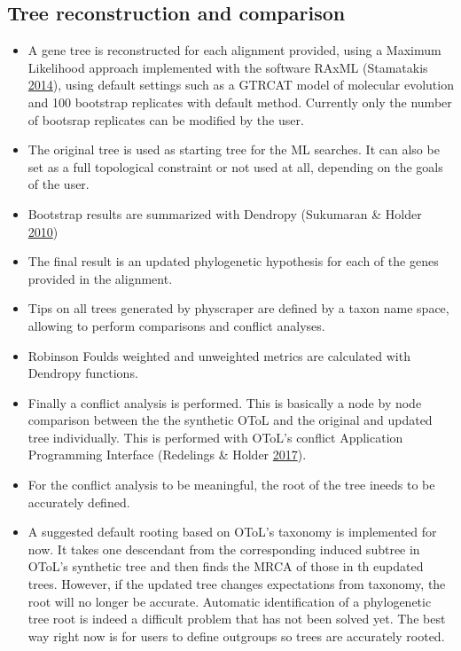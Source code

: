 \documentclass[]{article}
\providecommand{\tightlist}{%
  \setlength{\itemsep}{0pt}\setlength{\parskip}{0pt}}
\begin{document}
\hypertarget{tree-reconstruction-and-comparison}{%
\subsection{Tree reconstruction and comparison}\label{tree-reconstruction-and-comparison}}

\begin{itemize}
\tightlist
\item
  A gene tree is reconstructed for each alignment provided, using a Maximum Likelihood approach implemented with the software RAxML (Stamatakis \protect\hyperlink{ref-stamatakis2014raxml}{2014}), using default settings such as a GTRCAT model of molecular evolution and 100 bootstrap replicates with default method. Currently only the number of bootsrap replicates can be modified by the user.
\item
  The original tree is used as starting tree for the ML searches. It can also be set as a full topological constraint or not used at all, depending on the goals of the user.
\item
  Bootstrap results are summarized with Dendropy (Sukumaran \& Holder \protect\hyperlink{ref-sukumaran2010dendropy}{2010})
\item
  The final result is an updated phylogenetic hypothesis for each of the genes provided in the alignment.
\item
  Tips on all trees generated by physcraper are defined by a taxon name space, allowing to perform comparisons and conflict analyses.
\item
  Robinson Foulds weighted and unweighted metrics are calculated with Dendropy functions.
\item
  Finally a conflict analysis is performed. This is basically a node by node comparison between the the synthetic OToL and the original and updated tree individually. This is performed with OToL's conflict Application Programming Interface (Redelings \& Holder \protect\hyperlink{ref-redelings2017supertree}{2017}).
\item
  For the conflict analysis to be meaningful, the root of the tree ineeds to be accurately defined.
\item
  A suggested default rooting based on OToL's taxonomy is implemented for now. It takes one descendant from the corresponding induced subtree in OToL's synthetic tree and then finds the MRCA of those in th eupdated trees. However, if the updated tree changes expectations from taxonomy, the root will no longer be accurate. Automatic identification of a phylogenetic tree root is indeed a difficult problem that has not been solved yet. The best way right now is for users to define outgroups so trees are accurately rooted.
\end{itemize}
\end{document}

